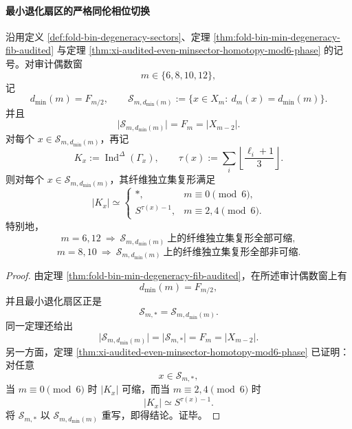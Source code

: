 \paragraph{最小退化扇区的严格同伦相位切换}

\begin{corollary}\label{cor:xi-time-part55ab-audited-even-minsector-strict-homotopy-transition}
沿用定义 \ref{def:fold-bin-degeneracy-sectors}、定理 \ref{thm:fold-bin-min-degeneracy-fib-audited} 与定理 \ref{thm:xi-audited-even-minsector-homotopy-mod6-phase} 的记号。对审计偶数窗
\[
m\in\{6,8,10,12\},
\]
记
\[
d_{\min}(m)=F_{m/2},
\qquad
\mathcal S_{m,d_{\min}(m)}:=\{x\in X_m:\ d_m(x)=d_{\min}(m)\}.
\]
并且
\[
\bigl|\mathcal S_{m,d_{\min}(m)}\bigr|=F_m=|X_{m-2}|.
\]
对每个 \(x\in \mathcal S_{m,d_{\min}(m)}\)，再记
\[
K_x:=\operatorname{Ind}^{\Delta}(\Gamma_x),
\qquad
\tau(x):=\sum_i\left\lfloor\frac{\ell_i+1}{3}\right\rfloor .
\]
则对每个 \(x\in \mathcal S_{m,d_{\min}(m)}\)，其纤维独立集复形满足
\[
|K_x|\simeq
\begin{cases}
*,& m\equiv 0\pmod 6,\\[1mm]
S^{\tau(x)-1},& m\equiv 2,4\pmod 6.
\end{cases}
\]
特别地，
\[
m=6,12\ \Longrightarrow\ \mathcal S_{m,d_{\min}(m)}\ \text{上的纤维独立集复形全部可缩},
\]
\[
m=8,10\ \Longrightarrow\ \mathcal S_{m,d_{\min}(m)}\ \text{上的纤维独立集复形全部非可缩}.
\]
\end{corollary}
\begin{proof}
由定理 \ref{thm:fold-bin-min-degeneracy-fib-audited}，在所述审计偶数窗上有
\[
d_{\min}(m)=F_{m/2},
\]
并且最小退化扇区正是
\[
\mathcal S_{m,*}=\mathcal S_{m,d_{\min}(m)}.
\]
同一定理还给出
\[
\bigl|\mathcal S_{m,d_{\min}(m)}\bigr|=\bigl|\mathcal S_{m,*}\bigr|=F_m=|X_{m-2}|.
\]
另一方面，定理 \ref{thm:xi-audited-even-minsector-homotopy-mod6-phase} 已证明：对任意
\[
x\in \mathcal S_{m,*},
\]
当 \(m\equiv 0\pmod 6\) 时 \(|K_x|\) 可缩，而当 \(m\equiv 2,4\pmod 6\) 时
\[
|K_x|\simeq S^{\tau(x)-1}.
\]
将 \(\mathcal S_{m,*}\) 以 \(\mathcal S_{m,d_{\min}(m)}\) 重写，即得结论。证毕。
\end{proof}
